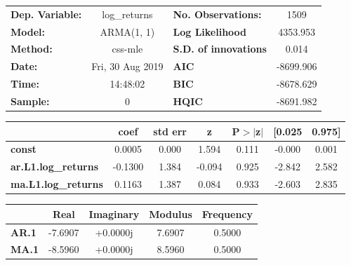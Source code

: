 \begin{center}
\begin{tabular}{lclc}
\toprule
\textbf{Dep. Variable:}     &        log\_returns       & \textbf{  No. Observations:  } &            1509            \\
\textbf{Model:}             &         ARMA(1, 1)        & \textbf{  Log Likelihood     } &          4353.953          \\
\textbf{Method:}            &          css-mle          & \textbf{  S.D. of innovations} &           0.014            \\
\textbf{Date:}              &      Fri, 30 Aug 2019     & \textbf{  AIC                } &         -8699.906          \\
\textbf{Time:}              &          14:48:02         & \textbf{  BIC                } &         -8678.629          \\
\textbf{Sample:}            &             0             & \textbf{  HQIC               } &         -8691.982          \\
\bottomrule
\end{tabular}
\begin{tabular}{lcccccc}
                            & \textbf{coef} & \textbf{std err} & \textbf{z} & \textbf{P$> |$z$|$} & \textbf{[0.025} & \textbf{0.975]}  \\
\midrule
\textbf{const}              &       0.0005  &        0.000     &     1.594  &         0.111        &       -0.000    &        0.001     \\
\textbf{ar.L1.log\_returns} &      -0.1300  &        1.384     &    -0.094  &         0.925        &       -2.842    &        2.582     \\
\textbf{ma.L1.log\_returns} &       0.1163  &        1.387     &     0.084  &         0.933        &       -2.603    &        2.835     \\
\bottomrule
\end{tabular}
\begin{tabular}{lcccc}
              & \textbf{            Real} & \textbf{         Imaginary} & \textbf{         Modulus} & \textbf{        Frequency}  \\
\midrule
\textbf{AR.1} &               -7.6907     &                +0.0000j     &                7.6907     &                0.5000       \\
\textbf{MA.1} &               -8.5960     &                +0.0000j     &                8.5960     &                0.5000       \\
\bottomrule
\end{tabular}
\end{center}
